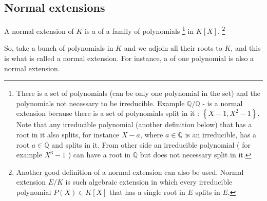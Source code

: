 \subsection{Normal extensions}

\begin{definition}
  A normal extension of $K$ is a  of a
  family of polynomials
  \footnote {
    There is a set of polynomials (can be only one polynomial in the
    set) and the polynomials not necessary to be irreducible. Example
    $\mathbb{Q}/\mathbb{Q}$ - is a normal 
    extension because there is a set of polynomials split in it :
    $\left\{X-1, X^2-1\right\}$. Note that any irreducible polynomial
    (another definition below) that has a root in it also splits, for
    instance $X - a$, where $a \in \mathbb{Q}$ is an irreducible, has
    a root $a \in \mathbb{Q}$ and splits in it. From other side an
    irreducible polynomial ( for example $X^3-1$ ) can have a root in
    $\mathbb{Q}$ but does not necessary split in it. 
  }
  in $K\left[X\right]$.
  \footnote{
    Another good definition of a normal extension
    \cite{wiki:normalextrus} can also be used. Normal extension $E/K$ is
    such algebraic extension in which every irreducible polynomial
    $P(X) \in K\left[X\right]$ that has a single root in $E$ splits in
    $E$.   
  }
  \label{def:normalextension}
\end{definition}

\begin{remark}
  So, take a bunch of polynomials in $K$ and we adjoin all their roots
  to $K$, and this is what is called a normal extension.
  For instance, a  of one polynomial is
  also a normal extension. 
\end{remark}

